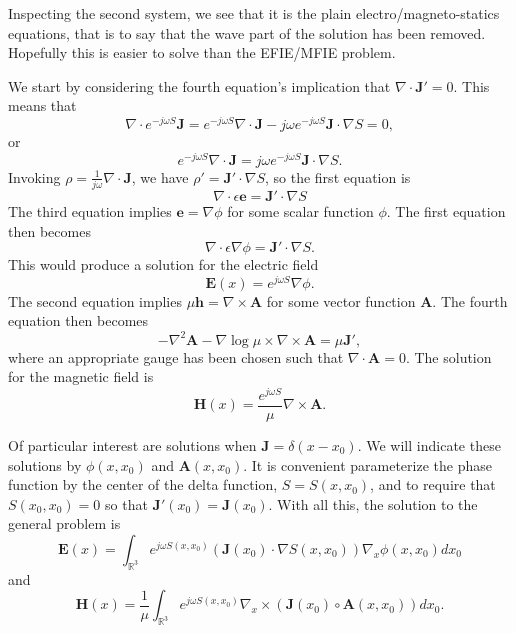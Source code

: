 \documentclass{article}
\newcommand{\Div}[0]{\nabla\cdot}
\newcommand{\Curl}[0]{\nabla\times}
\theoremstyle{plain}
\begin{document}
Inspecting the second system, we see that it is the plain electro/magneto-statics equations,
that is to say that the wave part of the solution has been removed. Hopefully this is easier to solve than the EFIE/MFIE problem.

We start by considering the fourth equation's implication that $\Div\mathbf{J}'=0$. This means that
\begin{equation}
	\Div e^{-j\omega S}\mathbf{J} = e^{-j\omega S}\Div\mathbf{J} - j\omega e^{-j\omega S}\mathbf{J}\cdot\nabla S = 0,
\end{equation}
or
\begin{equation}
	e^{-j\omega S}\Div\mathbf{J} = j\omega e^{-j\omega S}\mathbf{J}\cdot\nabla S.
\end{equation}
Invoking $\rho = \frac{1}{j\omega}\Div\mathbf{J}$, we have $\rho' = \mathbf{J}'\cdot\nabla S$, so the first equation is
\begin{equation}
	\Div\epsilon\mathbf{e} = \mathbf{J}'\cdot\nabla S
\end{equation}
The third equation implies $\mathbf{e} = \nabla\phi$ for some scalar function $\phi$. The first equation then becomes
\begin{equation}
	\Div\epsilon\nabla\phi = \mathbf{J}'\cdot\nabla S.
\end{equation}
This would produce a solution for the electric field
\begin{equation}
	\mathbf{E}(x) = e^{j\omega S}\nabla\phi.
\end{equation}
The second equation implies $\mu\mathbf{h} = \Curl\mathbf{A}$ for some vector function $\mathbf{A}$. The fourth equation then becomes
\begin{equation}
	-\nabla^2\mathbf{A} -\nabla\log{\mu}\times\Curl\mathbf{A} = \mu\mathbf{J}',
\end{equation}
where an appropriate gauge has been chosen such that $\Div\mathbf{A}=0$. The solution for the magnetic field is
\begin{equation}
	\mathbf{H}(x) = \frac{e^{j\omega S}}{\mu}\Curl\mathbf{A}.
\end{equation}


Of particular interest are solutions when $\mathbf{J} = \delta(x-x_0)$. 
We will indicate these solutions by $\phi(x,x_0)$ and $\mathbf{A}(x,x_0)$.
It is convenient parameterize the phase function by the center of the delta function, $S=S(x,x_0)$,
and to require that $S(x_0,x_0)=0$ so that $\mathbf{J}'(x_0)=\mathbf{J}(x_0)$.
With all this, the solution to the general problem is
\begin{equation}
	\mathbf{E}(x) = \int_{\mathbb{R}^3} e^{j\omega S(x,x_0)} \left( \mathbf{J}(x_0)\cdot\nabla S(x,x_0) \right)\nabla_x\phi(x,x_0) dx_0
\end{equation}
and
\begin{equation}
	\mathbf{H}(x) = \frac{1}{\mu}\int_{\mathbb{R}^3} e^{j\omega S(x,x_0)}\nabla_x\times\left( \mathbf{J}(x_0)\circ\mathbf{A}(x,x_0) \right) dx_0.
\end{equation}
\end{document}
